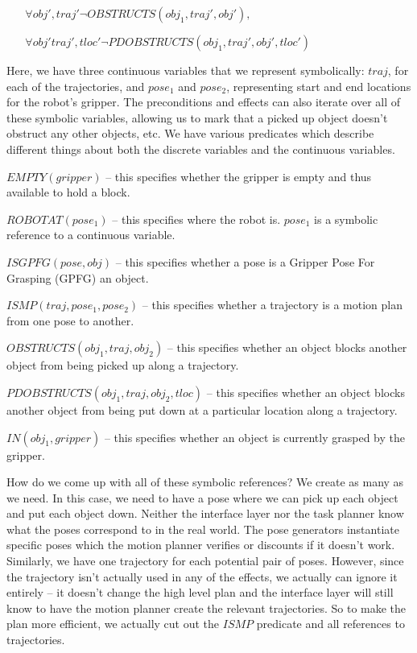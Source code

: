 \documentclass[12pt]{article}
\begin{document}
$\; \; \;\; \; \; \forall obj', traj' \neg OBSTRUCTS(obj_1, traj', obj'), $

$\; \; \; \; \; \;\forall obj' traj', tloc' \neg PDOBSTRUCTS(obj_1, traj', obj', tloc')$

Here, we have three continuous variables that we represent symbolically: $traj$, for each of the trajectories, and $pose_1$ and $pose_2$, representing start and end locations for the robot's gripper.
The preconditions and effects can also iterate over all of these symbolic variables, allowing us to mark that a picked up object doesn't obstruct any other objects, etc. 
We have various predicates which describe different things about both the discrete variables and the continuous variables.

$EMPTY(gripper)$ -- this specifies whether the gripper is empty and thus available to hold a block.

$ROBOTAT(pose_1)$ -- this specifies where the robot is.  $pose_1$ is a symbolic reference to a continuous variable.

$ISGPFG(pose, obj)$ -- this specifies whether a pose is a Gripper Pose For Grasping (GPFG) an object.

$ISMP(traj, pose_1, pose_2)$ -- this specifies whether a trajectory is a motion plan from one pose to another.

$OBSTRUCTS(obj_1, traj, obj_2)$ -- this specifies whether an object blocks another object from being picked up along a trajectory.

$PDOBSTRUCTS(obj_1, traj, obj_2, tloc)$ -- this specifies whether an object blocks another object from being put down at a particular location along a trajectory.

$IN(obj_1, gripper)$ -- this specifies whether an object is currently grasped by the gripper.



How do we come up with all of these symbolic references?  
We create as many as we need.  
In this case, we need to have a pose where we can pick up each object and put each object down.  
Neither the interface layer nor the task planner know what the poses correspond to in the real world.
The pose generators instantiate specific poses which the motion planner verifies or discounts if it doesn't work.
Similarly, we have one trajectory for each potential pair of poses.  
However, since the trajectory isn't actually used in any of the effects, we actually can ignore it entirely -- it doesn't change the high level plan and the interface layer will still know to have the motion planner create the relevant trajectories. 
So to make the plan more efficient, we actually cut out the $ISMP$ predicate and all references to trajectories.
\end{document}

